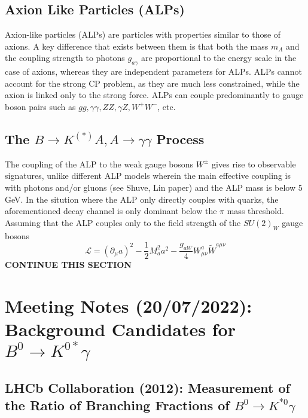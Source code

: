 \documentclass{article}
\begin{document}
\subsection*{Axion Like Particles (ALPs)}
Axion-like particles (ALPs) are particles with properties similar to those of axions. A key difference that exists between them is that both the mass $m_{A}$ and the coupling strength to photons $g_{a\gamma}$ are proportional to the energy scale
in the case of axions, whereas they are independent parameters for ALPs. ALPs cannot account for the strong CP problem, as they are much less constrained, while the axion is linked only to the strong force. ALPs can couple predominantly to gauge boson pairs such as $gg, \gamma\gamma, ZZ, \gamma Z, W^{+}W^{-}$, etc.

\subsection*{The $B\rightarrow K^{(*)}A, A\rightarrow \gamma\gamma$ Process}
The coupling of the ALP to the weak gauge bosons $W^{\pm}$ gives rise to observable signatures, unlike different ALP models wherein the main effective coupling is with photons and/or gluons (see Shuve, Lin paper) and the ALP mass is below 5 GeV. In the sitution where the ALP only directly couples with quarks, the aforementioned decay channel is only dominant below the $\pi$ mass threshold. Assuming that the ALP couples only to the field strength of the $SU(2)_{W}$ gauge bosons
\begin{equation}
    \mathcal{L} = (\partial_{\mu} a)^{2}-\frac{1}{2}M_{a}^{2}a^{2}-\frac{g_{aW}}{4}W_{\mu\nu}^{a}\tilde{W}^{a\mu\nu}
\end{equation}
\textbf{CONTINUE THIS SECTION}
\section{Meeting Notes (20/07/2022): Background Candidates for $B^{0}\rightarrow K^{0*}\gamma$}
\subsection{LHCb Collaboration (2012): Measurement of the Ratio of Branching Fractions of $B^{0}\rightarrow K^{*0}\gamma$}
\end{document}
